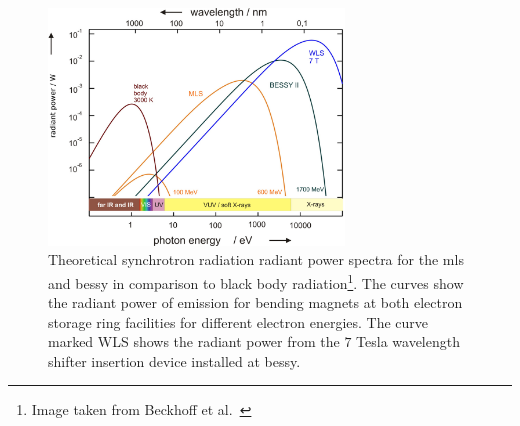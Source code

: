 \begin{figure}
 \includegraphics[width=0.7\textwidth]{img/exp-bessy-dipole-spectrum.jpeg}
 \caption[Theoretical synchrotron radiation radiant power spectra]{Theoretical synchrotron radiation radiant power spectra for the \gls{mls} and \gls{bessy} in comparison to black body radiation\footnote{Image taken from Beckhoff et al.~\cite{beckhoff_quarter-century_2009}}. The curves show the radiant power of emission for bending magnets at both electron storage ring facilities for different electron energies. The curve marked WLS shows the radiant power from the $7$ Tesla wavelength shifter insertion device installed at \gls{bessy}.}
 \label{ch_exp:fig_experimental_synchrotron_spectra}
\end{figure}

